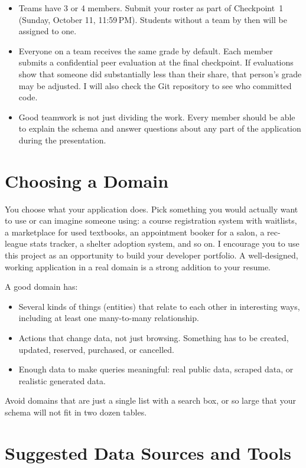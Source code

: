 \documentclass[11pt]{article}
\newcommand{\cponedue}{Sunday, October 11, 11:59\,PM}
\begin{document}
\begin{itemize}
  \item Teams have 3 or 4 members. Submit your roster as part of Checkpoint~1 (\cponedue). Students without a team by then will be assigned to one.
  \item Everyone on a team receives the same grade by default. Each member submits a confidential peer evaluation at the final checkpoint. If evaluations show that someone did substantially less than their share, that person's grade may be adjusted. I will also check the Git repository to see who committed code.
  \item Good teamwork is not just dividing the work. Every member should be able to explain the schema and answer questions about any part of the application during the presentation.
\end{itemize}

\section{Choosing a Domain}

You choose what your application does. Pick something you would actually want to use or can imagine someone using: a course registration system with waitlists, a marketplace for used textbooks, an appointment booker for a salon, a rec-league stats tracker, a shelter adoption system, and so on.
I encourage you to use this project as an opportunity to build your developer portfolio. A well-designed, working application in a real domain is a strong addition to your resume.

A good domain has:
\begin{itemize}
  \item Several kinds of things (entities) that relate to each other in interesting ways, including at least one many-to-many relationship.
  \item Actions that change data, not just browsing. Something has to be created, updated, reserved, purchased, or cancelled.
  \item Enough data to make queries meaningful: real public data, scraped data, or realistic generated data.
\end{itemize}

\noindent Avoid domains that are just a single list with a search box, or so large that your schema will not fit in two dozen tables. 

\section{Suggested Data Sources and Tools}\label{sec:tools}
\end{document}
